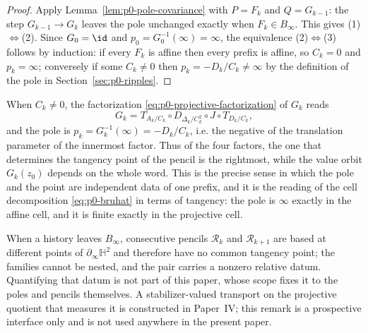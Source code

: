 \begin{proof}
Apply Lemma~\ref{lem:p0-pole-covariance} with $P=F_k$ and $Q=G_{k-1}$: the step
$G_{k-1}\to G_k$ leaves the pole unchanged exactly when $F_k\in B_\infty$.  This
gives (1)$\Leftrightarrow$(2).  Since $G_0=\id$ and $p_0=G_0^{-1}(\infty)
=\infty$, the equivalence (2)$\Leftrightarrow$(3) follows by induction: if
every $F_k$ is affine then every prefix is affine, so $C_k=0$ and
$p_k=\infty$; conversely if some $C_k\ne0$ then $p_k=-D_k/C_k\ne\infty$ by the definition of the pole in
Section~\ref{sec:p0-ripples}.
\end{proof}

\begin{remark}
\label{rem:p0-pole-bruhat}
When $C_k\ne0$, the factorization \eqref{eq:p0-projective-factorization} of
$G_k$ reads
\[
  G_k
  =T_{A_k/C_k}\circ D_{\Delta_k/C_k^{2}}\circ J\circ T_{D_k/C_k},
\]
and the pole is
$p_k=G_k^{-1}(\infty)=-D_k/C_k$, i.e. the negative of the translation parameter
of the innermost factor.  Thus of the four factors, the one that determines the
tangency point of the pencil is the rightmost, while the value orbit
$G_k(z_0)$ depends on the whole word.  This is the precise sense in which the
pole and the point are independent data of one prefix, and it is the reading of
the cell decomposition \eqref{eq:p0-bruhat} in terms of tangency: the pole is
$\infty$ exactly in the affine cell, and it is finite exactly in the projective
cell.
\end{remark}

\begin{remark}
\label{rem:p0-pole-forward}
When a history leaves $B_\infty$, consecutive pencils $\mathcal R_k$ and
$\mathcal R_{k+1}$ are based at different points of $\partial_\infty\mathbb H^2$
and therefore have no common tangency point; the families cannot be nested, and
the pair carries a nonzero relative datum.  Quantifying that datum is not part
of this paper, whose scope fixes it to the poles and pencils themselves.  A
stabilizer-valued transport on the projective quotient that measures it is
constructed in Paper~IV; this remark is a prospective interface only and is not
used anywhere in the present paper.
\end{remark}
